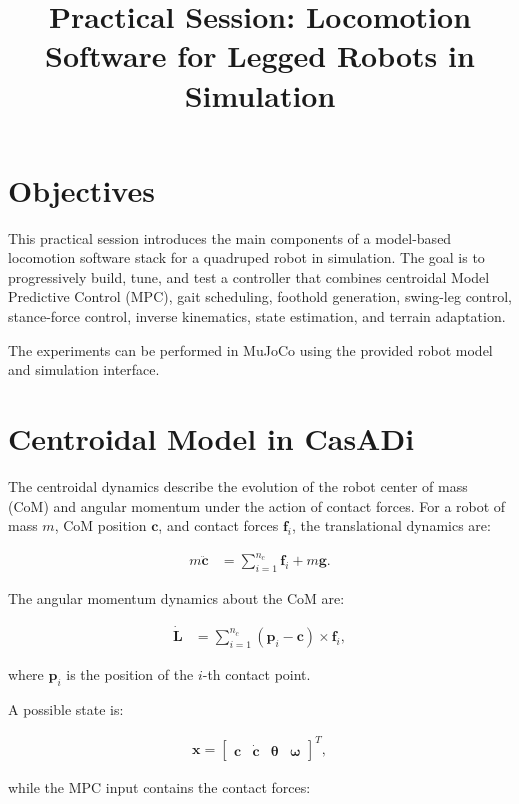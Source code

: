 \documentclass[11pt,a4paper]{article}
\title{\textbf{Practical Session: Locomotion Software for Legged Robots in Simulation}}
\author{}
\date{}
\begin{document}
\maketitle

\section{Objectives}

This practical session introduces the main components of a model-based locomotion software stack for a quadruped robot in simulation. The goal is to progressively build, tune, and test a controller that combines centroidal Model Predictive Control (MPC), gait scheduling, foothold generation, swing-leg control, stance-force control, inverse kinematics, state estimation, and terrain adaptation.

The experiments can be performed in MuJoCo using the provided robot model and simulation interface.

\section{Centroidal Model in CasADi}

The centroidal dynamics describe the evolution of the robot center of mass (CoM) and angular momentum under the action of contact forces. For a robot of mass \(m\), CoM position \(\bm{c}\), and contact forces \(\bm{f}_i\), the translational dynamics are:

\begin{align*}
m\ddot{\bm{c}} &= \sum_{i=1}^{n_c} \bm{f}_i + m\bm{g}.
\end{align*}

The angular momentum dynamics about the CoM are:

\begin{align*}
\dot{\bm{L}} &=
\sum_{i=1}^{n_c}
(\bm{p}_i-\bm{c}) \times \bm{f}_i,
\end{align*}

where \(\bm{p}_i\) is the position of the \(i\)-th contact point.

A possible state is:

\begin{align*}
\bm{x} =
\begin{bmatrix}
\bm{c} &
\dot{\bm{c}} &
\bm{\theta} &
\bm{\omega}
\end{bmatrix}^{T},
\end{align*}

while the MPC input contains the contact forces:
\end{document}
